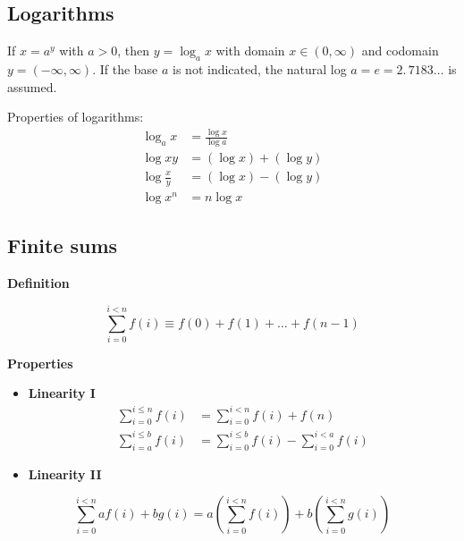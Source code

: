 \documentclass[justified,sixbynine]{tufte-book}
\def\subsubsection#1{{\bf #1}}
\theoremstyle{plain}%
\theoremstyle{definition}
\theoremstyle{remark}
\begin{document}
\begin{fullwidth}
\goodbreak\subsection{Logarithms}

If $x=a^y$ with $a>0$, then $y=\log _ax$ with domain $x\in (0,\infty )$ and
codomain $y=(-\infty ,\infty )$. If the base $a$ is not indicated, the
natural log $a=e=\allowbreak 2.\,7183\dots$ is assumed.

Properties of logarithms:
\begin{align}
\log _ax &= \frac{\log x}{\log a} \\
\log xy &= (\log x)+(\log y) \\
\log \frac xy &= (\log x)-(\log y) \\
\log x^n &= n\log x
\end{align}

\goodbreak\subsection{Finite sums}

\subsubsection{Definition}

\begin{equation}
\sum_{i=0}^{i<n}f(i)\equiv f(0)+f(1)+\dots+f(n-1)
\end{equation}

\subsubsection{Properties}

\begin{itemize}
\item  {\bf Linearity I}
\begin{align}
\sum_{i=0}^{i\leq n}f(i) &= \sum_{i=0}^{i<n}f(i)+f(n) \\
\sum_{i=a}^{i\leq b}f(i) &= \sum_{i=0}^{i\leq b}f(i)-\sum_{i=0}^{i<a}f(i)
\end{align}

\item  {\bf Linearity II}
\end{itemize}

\begin{equation}
\sum_{i=0}^{i<n}af(i)+bg(i)=a\left( \sum_{i=0}^{i<n}f(i)\right) +b\left(
\sum_{i=0}^{i<n}g(i)\right)
\end{equation}


\end{fullwidth}
\end{document}
